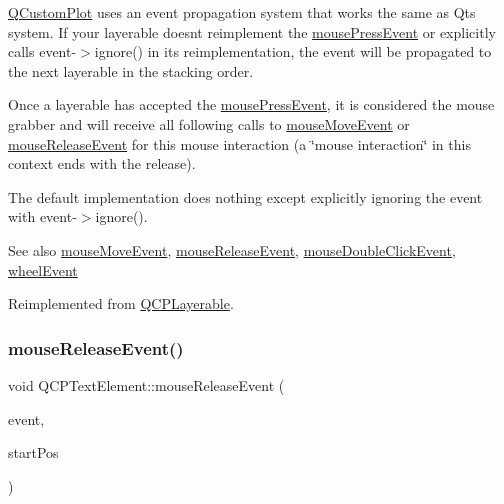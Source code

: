 \hyperlink{class_q_custom_plot}{Q\+Custom\+Plot} uses an event propagation system that works the same as Qt\textquotesingle{}s system. If your layerable doesn\textquotesingle{}t reimplement the \hyperlink{class_q_c_p_text_element_ad7b2c98355e3d2f912574b74fcee0574}{mouse\+Press\+Event} or explicitly calls {\ttfamily event-\/$>$ignore()} in its reimplementation, the event will be propagated to the next layerable in the stacking order.

Once a layerable has accepted the \hyperlink{class_q_c_p_text_element_ad7b2c98355e3d2f912574b74fcee0574}{mouse\+Press\+Event}, it is considered the mouse grabber and will receive all following calls to \hyperlink{class_q_c_p_layerable_a9eee1ba47fd69be111059ca3881933e4}{mouse\+Move\+Event} or \hyperlink{class_q_c_p_text_element_acfcbaf9b1da18745e72726aafb39c855}{mouse\+Release\+Event} for this mouse interaction (a \char`\"{}mouse interaction\char`\"{} in this context ends with the release).

The default implementation does nothing except explicitly ignoring the event with {\ttfamily event-\/$>$ignore()}.

\begin{DoxySeeAlso}{See also}
\hyperlink{class_q_c_p_layerable_a9eee1ba47fd69be111059ca3881933e4}{mouse\+Move\+Event}, \hyperlink{class_q_c_p_text_element_acfcbaf9b1da18745e72726aafb39c855}{mouse\+Release\+Event}, \hyperlink{class_q_c_p_text_element_a2272ff775ab385f612e9fd39773de7c0}{mouse\+Double\+Click\+Event}, \hyperlink{class_q_c_p_layerable_a47dfd7b8fd99c08ca54e09c362b6f022}{wheel\+Event} 
\end{DoxySeeAlso}


Reimplemented from \hyperlink{class_q_c_p_layerable_af6567604818db90f4fd52822f8bc8376}{Q\+C\+P\+Layerable}.

\mbox{\label{class_q_c_p_text_element_acfcbaf9b1da18745e72726aafb39c855}} 
\subsubsection{\texorpdfstring{mouse\+Release\+Event()}{mouseReleaseEvent()}\hspace{0.1cm}{\footnotesize\ttfamily [1/2]}}
{\footnotesize\ttfamily void Q\+C\+P\+Text\+Element\+::mouse\+Release\+Event (\begin{DoxyParamCaption}\item[{Q\+Mouse\+Event $\ast$}]{event,  }\item[{const Q\+PointF \&}]{start\+Pos }\end{DoxyParamCaption})\hspace{0.3cm}{\ttfamily [virtual]}}

